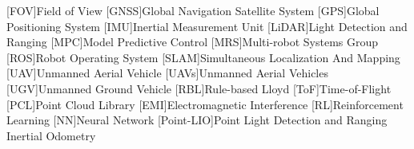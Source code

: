 
\begin{acronym}
  [FOV]{Field of View}
  [GNSS]{Global Navigation Satellite System}
  [GPS]{Global Positioning System}
  [IMU]{Inertial Measurement Unit}
  [LiDAR]{Light Detection and Ranging}
  [MPC]{Model Predictive Control}
  [MRS]{Multi-robot Systems Group}
  [ROS]{Robot Operating System}
  [SLAM]{Simultaneous Localization And Mapping}
  [UAV]{Unmanned Aerial Vehicle}
  [UAVs]{Unmanned Aerial Vehicles}
  [UGV]{Unmanned Ground Vehicle}
  [RBL]{Rule-based Lloyd}
  [ToF]{Time-of-Flight}
  [PCL]{Point Cloud Library}
  [EMI]{Electromagnetic Interference}
  [RL]{Reinforcement Learning}
  [NN]{Neural Network}
  [Point-LIO]{Point Light Detection and Ranging Inertial Odometry}
\end{acronym}
